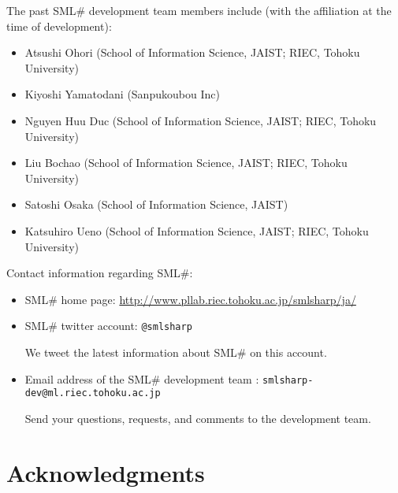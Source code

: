 \documentclass{jbook}
\newcommand{\txt}[2]{#2}
\newcommand{\smlsharp}{SML\#}
\begin{document}
	The past \smlsharp{} development team members include (with the
affiliation at the time of development):
\begin{itemize}
\item Atsushi Ohori (School of Information Science, JAIST; RIEC, Tohoku University)
\item Kiyoshi Yamatodani (Sanpukoubou Inc)
\item Nguyen Huu Duc (School of Information Science, JAIST; RIEC, Tohoku University)
\item Liu Bochao (School of Information Science, JAIST; RIEC, Tohoku University)
\item Satoshi Osaka (School of Information Science, JAIST)
\item Katsuhiro Ueno (School of Information Science, JAIST; RIEC, Tohoku University)
\end{itemize}

	Contact information regarding \smlsharp{}:
\begin{itemize}
\item \smlsharp{} home page:
\url{http://www.pllab.riec.tohoku.ac.jp/smlsharp/ja/}

%


\item \smlsharp{} twitter account:
{\tt @smlsharp}

	We tweet the latest information about \smlsharp{} on this account.

\item Email address of the \smlsharp{} development team :
{\tt smlsharp-dev@ml.riec.tohoku.ac.jp}

Send your questions, requests, and comments to the development team.
\end{itemize}
\fi%

\section{\txt{謝辞}{Acknowledgments}}
\label{sec:acknowledgements}
	
\end{document}
